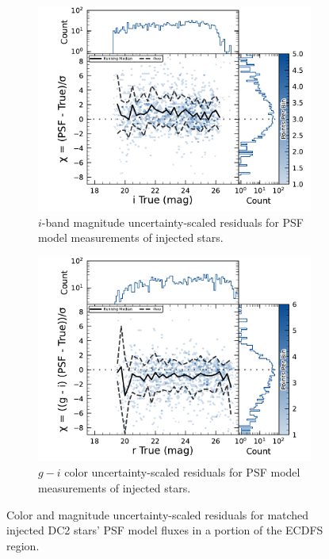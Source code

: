 \begin{figure}[hbt!]
  \centering
  \begin{subfigure}[t]{0.45\textwidth}
  \includegraphics[width=\linewidth]{injected_lsst_cells_v1_5063_i_mag_chi_psf}
  \caption{$i$-band magnitude uncertainty-scaled residuals for PSF model measurements of injected stars.}
  \end{subfigure}\hfill
  \begin{subfigure}[t]{0.45\textwidth}
  \includegraphics[width=\linewidth]{injected_lsst_cells_v1_5063_r_color_chi_psf_g_minus_i}
  \caption{$g-i$ color uncertainty-scaled residuals for PSF model measurements of injected stars.}
  \end{subfigure}\hfill
\caption{Color and magnitude uncertainty-scaled residuals for matched injected DC2 stars' PSF model fluxes in a portion of the \gls{ECDFS} region.}
\label{fig:injected_lsst_cells_v1_5063_star_psf_chi}
\end{figure}

